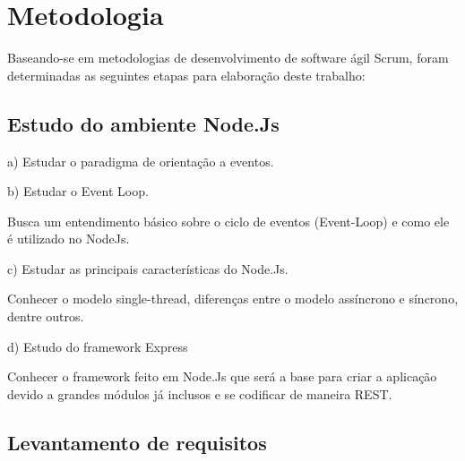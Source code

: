 \chapter{Metodologia}
\label{metodologia}

\vspace{-1.9cm}

  Baseando-se em metodologias de desenvolvimento de software ágil Scrum, foram determinadas 
  as seguintes etapas para elaboração deste trabalho:


\section{Estudo do ambiente Node.Js}
  
  \begin{compactitem}
    \item[a)] Estudar o paradigma de orientação a eventos.
    \item[b)] Estudar o Event Loop.
    
    Busca um entendimento básico sobre o ciclo de eventos (Event-Loop) e como ele é utilizado no NodeJs.
    
    \item[c)] Estudar as principais características do Node.Js.
    
    Conhecer o modelo single-thread, diferenças entre o modelo assíncrono e síncrono, dentre outros.
    
    \item[d)] Estudo do framework Express
    
    Conhecer o framework feito em Node.Js que será a base para criar a 
    aplicação devido a grandes módulos já inclusos e se codificar de maneira \ac{REST}.

  \end{compactitem}
  
\section{Levantamento de requisitos}

